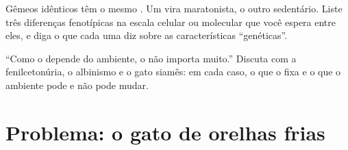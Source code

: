 \begin{exercise}[$\star\star\star$]\label{exo:g11:enzymes-and-phenotype:14}
Gêmeos idênticos têm o mesmo . Um vira maratonista, o outro
sedentário. Liste três diferenças fenotípicas na escala celular ou
molecular que você espera entre eles, e diga o que cada uma diz sobre
as características ``genéticas''.
\end{exercise}

\begin{exercise}[$\star\star\star$]\label{exo:g11:enzymes-and-phenotype:15}
``Como o  depende do ambiente, o  não importa muito.''
Discuta com a fenilcetonúria, o albinismo e o gato siamês: em cada
caso, o que o  fixa e o que o ambiente pode e não pode mudar.
\end{exercise}

\section{Problema: o gato de orelhas frias}

